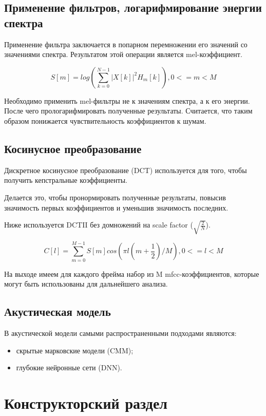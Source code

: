 \documentclass[a4paper,14pt]{extarticle}
\begin{document}
 	\subsection{Применение фильтров, логарифмирование энергии спектра}
 	
 	Применение фильтра заключается в попарном перемножении его значений со значениями спектра. Результатом этой операции является mel-коэффициент.
 	
 	\[S[m] = log(\sum_{k=0}^{N - 1} |X[k]|^2 H_m[k]), 0 <= m < M\]
 	
 	Необходимо применить mel-фильтры не к значениям спектра, а к его энергии. После чего прологарифмировать полученные результаты. Считается, что таким образом понижается чувствительность коэффициентов к шумам.
 	
 	\subsection{Косинусное преобразование}
 	
 	Дискретное косинусное преобразование (DCT) используется для того, чтобы получить  кепстральные коэффициенты.
 	
 	Делается это, чтобы пронормировать полученные результаты, повысив значимость первых коэффициентов и уменьшив значимость последних.
 	
 	Ниже используется DCTII без домножений на scale factor ($\sqrt{\frac{2}{N}}$).
 	
 	\[C[l] = \sum_{m=0}^{M - 1}S[m] cos(\pi l (m + \frac{1}{2})/M), 0 <= l < M\]
 	
 	На выходе имеем для каждого фрейма набор из M mfcc-коэффициентов, которые могут быть использованы для дальнейшего анализа.
 	
 	\subsection{Акустическая модель}
 	
 	В акустической модели самыми распространенными подходами являются:
 	\begin{itemize}
 		\item скрытые марковские модели (CMM);
 		\item глубокие нейронные сети (DNN).
 	\end{itemize}
 	
 	\newpage
 	
 	\section{Конструкторский раздел}
 	
\end{document}
